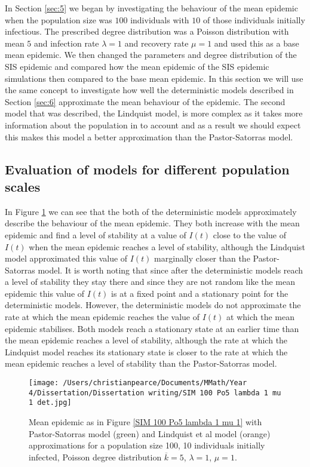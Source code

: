 \documentclass{uonmathsreport}
\begin{document}
In Section \ref{sec:5} we began by investigating the behaviour of the mean epidemic when the population size was $100$ individuals with $10$ of those individuals initially infectious. The prescribed degree distribution was a Poisson distribution with mean $5$ and infection rate $\lambda=1$ and recovery rate $\mu=1$ and used this as a base mean epidemic. We then changed the parameters and degree distribution of the SIS epidemic and compared how the mean epidemic of the SIS epidemic simulations then compared to the base mean epidemic. In this section we will use the same concept to investigate how well the deterministic models described in Section \ref{sec:6} approximate the mean behaviour of the epidemic. The second model that was described, the Lindquist model, is more complex as it takes more information about the population in to account and as a result we should expect this makes this model a better approximation than the Pastor-Satorras model. 

\subsection{Evaluation of models for different population scales} \label{subsec:7.1}

In Figure \ref{7.1} we can see that the both of the deterministic models approximately describe the behaviour of the mean epidemic. They both increase with the mean epidemic and find a level of stability at a value of $I(t)$ close to the value of $I(t)$ when the mean epidemic reaches a level of stability, although the Lindquist model approximated this value of $I(t)$ marginally closer than the Pastor-Satorras model. It is worth noting that since after the deterministic models reach a level of stability they stay there and since they are not random like the mean epidemic this value of $I(t)$ is at a fixed point and a stationary point for the deterministic models. However, the deterministic models do not approximate the rate at which the mean epidemic reaches the value of $I(t)$ at which the mean epidemic stabilises. Both models reach a stationary state at an earlier time than the mean epidemic reaches a level of stability, although the rate at which the Lindquist model reaches its stationary state is closer to the rate at which the mean epidemic reaches a level of stability than the Pastor-Satorras model.

\begin{figure}
\begin{center}
\texttt{[image: /Users/christianpearce/Documents/MMath/Year 4/Dissertation/Dissertation writing/SIM 100 Po5 lambda 1 mu 1 det.jpg]}
\end{center}
\caption{Mean epidemic as in Figure \ref{SIM 100 Po5 lambda 1 mu 1} with Pastor-Satorras model (green) and Lindquist et al model (orange) approximations for a population size 100, 10 individuals initially infected, Poisson degree distribution $\overline{k}=5$, $\lambda=1$, $\mu=1$.}
\label{7.1}
\end{figure}
\end{document}
